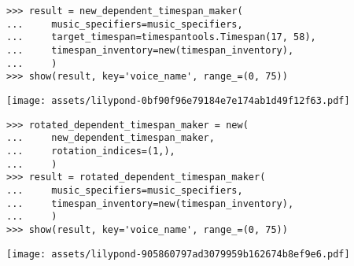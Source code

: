 \begin{comment}
<abjad>
result = new_dependent_timespan_maker(
    music_specifiers=music_specifiers,
    target_timespan=timespantools.Timespan(17, 58),
    timespan_inventory=new(timespan_inventory),
    )
show(result, key='voice_name', range_=(0, 75))
</abjad>
\end{comment}

\begin{singlespacing}
\vspace{-0.5\baselineskip}
\begin{lstlisting}
>>> result = new_dependent_timespan_maker(
...     music_specifiers=music_specifiers,
...     target_timespan=timespantools.Timespan(17, 58),
...     timespan_inventory=new(timespan_inventory),
...     )
>>> show(result, key='voice_name', range_=(0, 75))
\end{lstlisting}
\noindent\texttt{[image: assets/lilypond-0bf90f96e79184e7e174ab1d49f12f63.pdf]}
\end{singlespacing}

\begin{comment}
<abjad>
rotated_dependent_timespan_maker = new(
    new_dependent_timespan_maker,
    rotation_indices=(1,),
    )
result = rotated_dependent_timespan_maker(
    music_specifiers=music_specifiers,
    timespan_inventory=new(timespan_inventory),
    )
show(result, key='voice_name', range_=(0, 75))
</abjad>
\end{comment}

\begin{singlespacing}
\vspace{-0.5\baselineskip}
\begin{lstlisting}
>>> rotated_dependent_timespan_maker = new(
...     new_dependent_timespan_maker,
...     rotation_indices=(1,),
...     )
>>> result = rotated_dependent_timespan_maker(
...     music_specifiers=music_specifiers,
...     timespan_inventory=new(timespan_inventory),
...     )
>>> show(result, key='voice_name', range_=(0, 75))
\end{lstlisting}
\noindent\texttt{[image: assets/lilypond-905860797ad3079959b162674b8ef9e6.pdf]}
\end{singlespacing}

\begin{comment}
<abjad>
rotated_dependent_timespan_maker = new(
    new_dependent_timespan_maker,
    rotation_indices=(1, -1),
    )
result = rotated_dependent_timespan_maker(
    music_specifiers=music_specifiers,
    timespan_inventory=new(timespan_inventory),
    )
show(result, key='voice_name', range_=(0, 75))
</abjad>
\end{comment}

